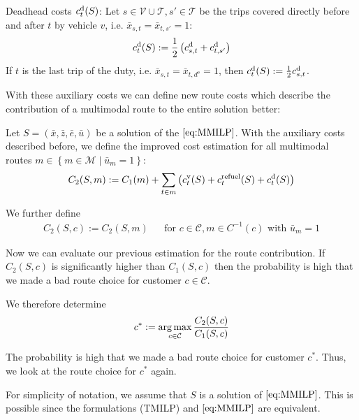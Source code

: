 Deadhead costs $c^{\operatorname{d}}_t(S)$: Let $s\in\mathcal{V}\cup\mathcal{T},s'\in\mathcal{T}$ be the trips covered directly before and after $t$ by vehicle $v$, i.e. $\bar{x}_{s,t}=\bar{x}_{t,s'}=1$:
\begin{align*}
	c^{\operatorname{d}}_t(S) := \frac 1 2 \left(c^{\operatorname{d}}_{s,t}+c^{\operatorname{d}}_{t,s'}\right)
\end{align*}
If $t$ is the last trip of the duty, i.e. $\bar{x}_{s,t}=\bar{x}_{t,d^{\operatorname{e}}}=1$, then $c^{\operatorname{d}}_t(S) := \frac 1 2 c^{\operatorname{d}}_{s,t}$.

With these auxiliary costs we can define new route costs which describe the contribution of a multimodal route to the entire solution better:

\begin{definition}

Let $S=\left(\bar{x},\bar{z},\bar{e},\bar{u}\right)$ be a solution of the $\eqref{eq:MMILP}$. With the auxiliary costs described before, we define the improved cost estimation for all multimodal routes $m\in\left\{m\in\mathcal{M}\mid \bar{u}_m=1\right\}$:
\begin{align*}
	C_2(S,m) := C_1(m) + \sum_{t\in m}\left(c^{\operatorname{v}}_t(S) + c^{\operatorname{refuel}}_t(S) + c^{\operatorname{d}}_t(S)\right)
\end{align*}

We further define
\begin{align*}
	C_2(S,c) := C_2(S,m) && \text{for } c\in\mathcal{C},m\in C^{-1}(c) \text{ with } \bar{u}_m = 1
\end{align*}

\end{definition}

Now we can evaluate our previous estimation for the route contribution. If $C_2(S,c)$ is significantly higher than $C_1(S,c)$ then the probability is high that we made a bad route choice for customer $c\in\mathcal{C}$.

We therefore determine
\begin{align*}
	c^* := \operatorname*{arg\,max}_{c\in\mathcal{C}} \frac{C_2(S,c)}{C_1(S,c)}
\end{align*}

The probability is high that we made a bad route choice for customer $c^*$. Thus, we look at the route choice for $c^*$ again.

\begin{remark}

For simplicity of notation, we assume that $S$ is a solution of $\eqref{eq:MMILP}$. This is possible since the formulations (TMILP) and $\eqref{eq:MMILP}$ are equivalent.

\end{remark}


